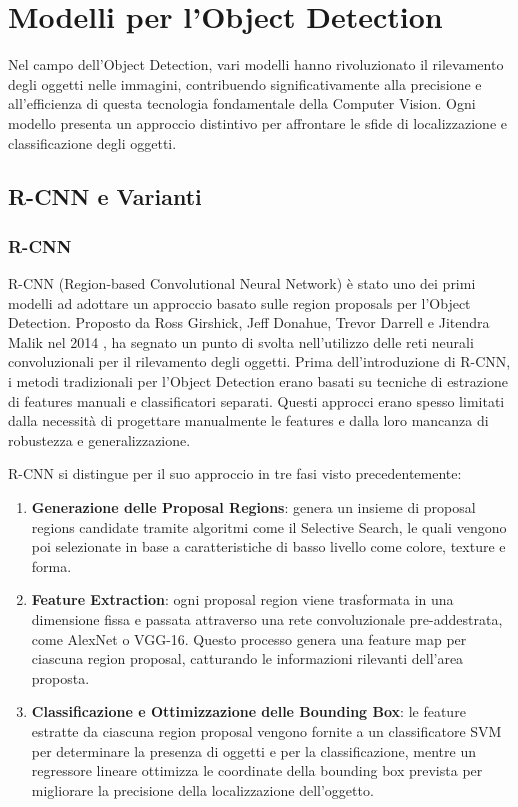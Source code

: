 \section{Modelli per l'Object Detection}

Nel campo dell'Object Detection, vari modelli hanno rivoluzionato il rilevamento degli oggetti nelle immagini, contribuendo significativamente alla precisione e all'efficienza di questa tecnologia fondamentale della Computer Vision. Ogni modello presenta un approccio distintivo per affrontare le sfide di localizzazione e classificazione degli oggetti.

\subsection{R-CNN e Varianti}

\subsubsection{R-CNN}
R-CNN (Region-based Convolutional Neural Network) è stato uno dei primi modelli ad adottare un approccio basato sulle region proposals per l'Object Detection. Proposto da Ross Girshick, Jeff Donahue, Trevor Darrell e Jitendra Malik nel 2014 \cite{6}, ha segnato un punto di svolta nell'utilizzo delle reti neurali convoluzionali per il rilevamento degli oggetti. Prima dell'introduzione di R-CNN, i metodi tradizionali per l'Object Detection erano basati su tecniche di estrazione di features manuali e classificatori separati. Questi approcci erano spesso limitati dalla necessità di progettare manualmente le features e dalla loro mancanza di robustezza e generalizzazione.

R-CNN si distingue per il suo approccio in tre fasi visto precedentemente:

\begin{enumerate}
    \item \textbf{Generazione delle Proposal Regions}: genera un insieme di proposal regions candidate tramite algoritmi come il Selective Search, le quali vengono poi selezionate in base a caratteristiche di basso livello come colore, texture e forma.
    \item \textbf{Feature Extraction}: ogni proposal region viene trasformata in una dimensione fissa e passata attraverso una rete convoluzionale pre-addestrata, come AlexNet o VGG-16. Questo processo genera una feature map per ciascuna region proposal, catturando le informazioni rilevanti dell'area proposta.
    \item \textbf{Classificazione e Ottimizzazione delle Bounding Box}: le feature estratte da ciascuna region proposal vengono fornite a un classificatore SVM per determinare la presenza di oggetti e per la classificazione, mentre un regressore lineare ottimizza le coordinate della bounding box prevista per migliorare la precisione della localizzazione dell'oggetto.
\end{enumerate}

